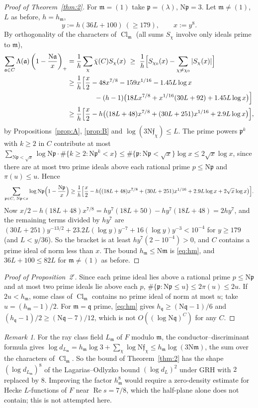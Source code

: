 \documentclass[11pt]{article}
\theoremstyle{definition}
\theoremstyle{remark}
\newtheorem{remark}[lemma]{Remark}
\numberwithin{equation}{section}
\newcommand{\fa}{\mathfrak a}
\newcommand{\fp}{\mathfrak p}
\newcommand{\fm}{\mathfrak m}
\newcommand{\ff}{\mathfrak f}
\newcommand{\fq}{\mathfrak q}
\newcommand{\Nm}{\mathrm N}
\newcommand{\Cl}{\operatorname{Cl}}
\newcommand{\Rea}{\operatorname{Re}}
\newcommand{\pos}[1]{\left(#1\right)_+}
\begin{document}
\begin{proof}[Proof of Theorem~\ref{thm:2}]
For $\fm=(1)$ take $\fp=(\lambda)$, $\Nm\fp=3$. Let $\fm\ne(1)$, $L$ as before, $h=h_\fm$,
\[
 y:=h(36L+100)\ (\ge179),\qquad x:=y^8 .
\]
By orthogonality of the characters of $\Cl_\fm$ (all sums $S_\chi$ involve only ideals prime to $\fm$),
\begin{align*}
 \sum_{\fa\in C}\Lambda(\fa)\pos{1-\frac{\Nm\fa}{x}}&=\frac1h\sum_\chi\bar\chi(C)S_\chi(x)\ \ge\ \frac1h\Bigl[S_{\chi_0}(x)-\sum_{\chi\ne\chi_0}|S_\chi(x)|\Bigr]\\
 &\ge\frac1h\Bigl[\frac x2-48x^{7/8}-159x^{1/16}-1.45L\log x\\
 &\qquad\qquad-(h-1)\bigl(18Lx^{7/8}+x^{1/16}(30L+92)+1.45L\log x\bigr)\Bigr]\\
 &\ge\frac1h\Bigl[\frac x2-h\bigl((18L+48)x^{7/8}+(30L+251)x^{1/16}+2.9L\log x\bigr)\Bigr],
\end{align*}
by Propositions~\ref{prop:A}, \ref{prop:B} and $\log(3\Nm\ff_\chi)\le L$. The prime powers $\fp^k$ with $k\ge2$ in $C$ contribute at most $\sum_{\Nm\fp<\sqrt x}\log\Nm\fp\cdot\#\{k\ge2:\Nm\fp^k<x\}\le\#\{\fp:\Nm\fp<\sqrt x\}\log x\le2\sqrt x\log x$, since there are at most two prime ideals above each rational prime $p\le\Nm\fp$ and $\pi(u)\le u$. Hence
\[
 \sum_{\fp\in C,\ \Nm\fp<x}\log\Nm\fp\Bigl(1-\frac{\Nm\fp}x\Bigr)\ge\frac1h\Bigl[\frac x2-h\bigl((18L+48)x^{7/8}+(30L+251)x^{1/16}+2.9L\log x+2\sqrt x\log x\bigr)\Bigr].
\]
Now $x/2-h(18L+48)x^{7/8}=hy^7(18L+50)-hy^7(18L+48)=2hy^7$, and the remaining terms divided by $hy^7$ are $(30L+251)y^{-13/2}+23.2L(\log y)y^{-7}+16(\log y)y^{-3}<10^{-4}$ for $y\ge179$ (and $L<y/36$). So the bracket is at least $hy^7(2-10^{-4})>0$, and $C$ contains a prime ideal of norm less than $x$. The bound $h_\fm\le\Nm\fm$ is \eqref{eq:hm}, and $36L+100\le82L$ for $\fm\ne(1)$ as before.
\end{proof}

\begin{proof}[Proof of Proposition~2$'$]
Since each prime ideal lies above a rational prime $p\le\Nm\fp$ and at most two prime ideals lie above each $p$, $\#\{\fp:\Nm\fp\le u\}\le2\pi(u)\le2u$. If $2u<h_\fm$, some class of $\Cl_\fm$ contains no prime ideal of norm at most $u$; take $u=(h_\fm-1)/2$. For $\fm=\fq$ prime, \eqref{eq:hm} gives $h_\fq\ge(\Nm\fq-1)/6$ and $(h_\fq-1)/2\ge(\Nm\fq-7)/12$, which is not $O((\log\Nm\fq)^C)$ for any $C$.
\end{proof}

\begin{remark}\label{rem:LO}
For the ray class field $L_\fm$ of $F$ modulo $\fm$, the conductor--discriminant formula \cite[Chapter~VII, \S11]{neukirch1999} gives $\log d_{L_\fm}=h_\fm\log3+\sum_\chi\log\Nm\ff_\chi\le h_\fm\log(3\Nm\fm)$, the sum over the characters of $\Cl_\fm$. So the bound of Theorem~\ref{thm:2} has the shape $(\log d_{L_\fm})^8$ of the Lagarias--Odlyzko bound $(\log d_L)^2$ under GRH \cite{lo1977} with $2$ replaced by $8$. Improving the factor $h_\fm^8$ would require a zero-density estimate for Hecke $L$-functions of $F$ near $\Rea s=7/8$, which the half-plane alone does not contain; this is not attempted here.
\end{remark}
\end{document}
